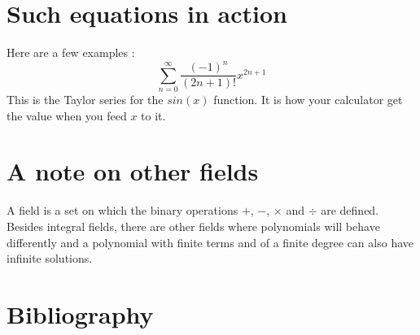 \documentclass[12pt]{article}
\begin{document}
\section{Such equations in action}
Here are a few examples :
\[
\sum_{n=0}^{\infty} \dfrac{(-1)^n}{(2n+1)!} x^{2n+1}
\]
This is the Taylor series for the $sin(x)$ function. It is how your calculator get the value when you feed $x$ to it.
\section*{A note on other fields}
A field is a set on which the binary operations $+$, $-$, $\times$ and $\div$ are defined.
Besides integral fields, there are other fields where polynomials will behave differently and a polynomial with finite terms and of a finite degree can also have infinite solutions.





\appendix
\section*{Bibliography}







\end{document}
